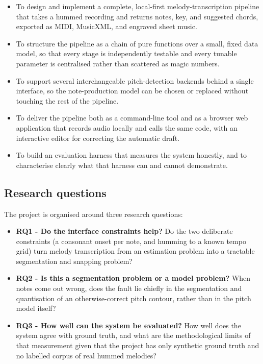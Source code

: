 \documentclass[12pt,a4paper]{article}
\begin{document}
\begin{itemize}
    \item To design and implement a complete, local-first melody-transcription
    pipeline that takes a hummed recording and returns notes, key, and
    suggested chords, exported as MIDI, MusicXML, and engraved sheet music.
    \item To structure the pipeline as a chain of pure functions over a small,
    fixed data model, so that every stage is independently testable and every
    tunable parameter is centralised rather than scattered as magic numbers.
    \item To support several interchangeable pitch-detection backends behind a
    single interface, so the note-production model can be chosen or replaced
    without touching the rest of the pipeline.
    \item To deliver the pipeline both as a command-line tool and as a browser
    web application that records audio locally and calls the same code, with an
    interactive editor for correcting the automatic draft.
    \item To build an evaluation harness that measures the system honestly, and
    to characterise clearly what that harness can and cannot demonstrate.
\end{itemize}

\subsection{Research questions}

The project is organised around three research questions:

\begin{itemize}
    \item \textbf{RQ1 - Do the interface constraints help?} Do the two
    deliberate constraints (a consonant onset per note, and humming to a known
    tempo grid) turn melody transcription from an estimation problem into a
    tractable segmentation and snapping problem?
    \item \textbf{RQ2 - Is this a segmentation problem or a model problem?}
    When notes come out wrong, does the fault lie chiefly in the segmentation
    and quantisation of an otherwise-correct pitch contour, rather than in the
    pitch model itself?
    \item \textbf{RQ3 - How well can the system be evaluated?} How well does
    the system agree with ground truth, and what are the methodological limits
    of that measurement given that the project has only synthetic ground truth
    and no labelled corpus of real hummed melodies?
\end{itemize}
\end{document}
